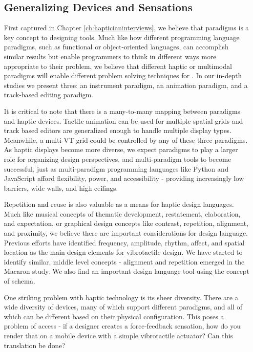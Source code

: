 \subsection{Generalizing Devices and Sensations}
First captured in Chapter \ref{ch:hapticianinterviews}, we believe that paradigms is a key concept to designing \haxd tools.
Much like how different programming language paradigms, such as functional or object-oriented languages, can accomplish similar results but enable programmers to think in different ways more appropriate to their problem, we believe that different haptic or multimodal paradigms will enable different problem solving techniques for \haxd.
In our in-depth studies we present three: an instrument paradigm, an animation paradigm, and a track-based editing paradigm.

It is critical to note that there is a many-to-many mapping between paradigms and haptic devices.
Tactile animation can be used for multiple spatial grids and track based editors are generalized enough to handle multiple display types.
Meanwhile, a multi-VT grid could be controlled by any of these three paradigms.
As haptic displays become more diverse, we expect paradigms to play a larger role for organizing design perspectives, and multi-paradigm tools to become successful, just as multi-paradigm programming languages like Python and JavaScript afford flexibility, power, and accessibility - providing increasingly low barriers, wide walls, and high ceilings.


Repetition and reuse is also valuable as a means for haptic design languages.
Much like musical concepts of thematic development, restatement, elaboration, and expectation, or graphical design concepts like contrast, repetition, alignment, and proximity, we believe there are important considerations for design language.
Previous efforts have identified frequency, amplitude, rhythm, affect, and spatial location as the main design elements for vibrotactile design.
We have started to identify similar, middle level concepts - alignment and repetition emerged in the Macaron study.
We also find an important design language tool using the concept of schema.


One striking problem with haptic technology is its sheer diversity.
There are a wide diversity of devices, many of which support different paradigms, and all of which can be different based on their physical configuration.
This poses a problem of access - if a designer creates a force-feedback sensation, how do you render that on a mobile device with a simple vibrotactile actuator?
Can this translation be done?

